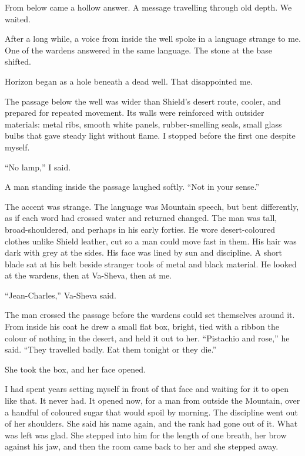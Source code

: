 From below came a hollow answer. A message travelling through old depth. We waited.\par

After a long while, a voice from inside the well spoke in a language strange to me. One of the wardens answered in the same language. The stone at the base shifted.\par

Horizon began as a hole beneath a dead well. That disappointed me.\par

The passage below the well was wider than Shield's desert route, cooler, and prepared for repeated movement. Its walls were reinforced with outsider materials: metal ribs, smooth white panels, rubber-smelling seals, small glass bulbs that gave steady light without flame. I stopped before the first one despite myself.\par

``No lamp,'' I said.\par

A man standing inside the passage laughed softly. ``Not in your sense.''\par

The accent was strange. The language was Mountain speech, but bent differently, as if each word had crossed water and returned changed. The man was tall, broad-shouldered, and perhaps in his early forties. He wore desert-coloured clothes unlike Shield leather, cut so a man could move fast in them. His hair was dark with grey at the sides. His face was lined by sun and discipline. A short blade sat at his belt beside stranger tools of metal and black material. He looked at the wardens, then at Va-Sheva, then at me.\par

``Jean-Charles,'' Va-Sheva said.\par

The man crossed the passage before the wardens could set themselves around it. From inside his coat he drew a small flat box, bright, tied with a ribbon the colour of nothing in the desert, and held it out to her. ``Pistachio and rose,'' he said. ``They travelled badly. Eat them tonight or they die.''\par

She took the box, and her face opened.\par

I had spent years setting myself in front of that face and waiting for it to open like that. It never had. It opened now, for a man from outside the Mountain, over a handful of coloured sugar that would spoil by morning. The discipline went out of her shoulders. She said his name again, and the rank had gone out of it. What was left was glad. She stepped into him for the length of one breath, her brow against his jaw, and then the room came back to her and she stepped away.\par

